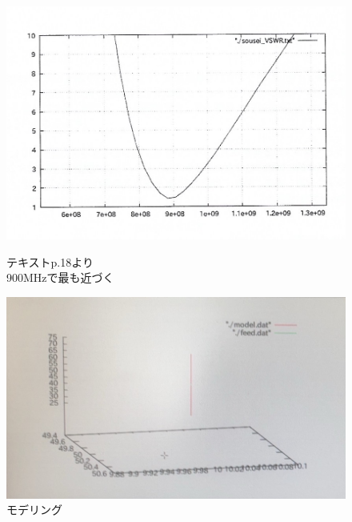\documentclass[dvipdfmx,autodetect-engine,titlepage]{jsarticle}
\begin{document}
\begin{figure}[h]
  \centering
  \begin{minipage}[b]{0.45\linewidth}
  \begin{center}
    \includegraphics[keepaspectratio,scale=0.2]{pic6.jpeg}
    \end{center}
    \caption{テキストp.18より\\900MHzで最も近づく}
  \end{minipage}
  \begin{minipage}[b]{0.45\linewidth}
  \begin{center}
    \includegraphics[keepaspectratio,scale=0.25]{pic9.jpg}
    \end{center}
    \caption{モデリング}
  \end{minipage}
\end{figure}
\end{document}
